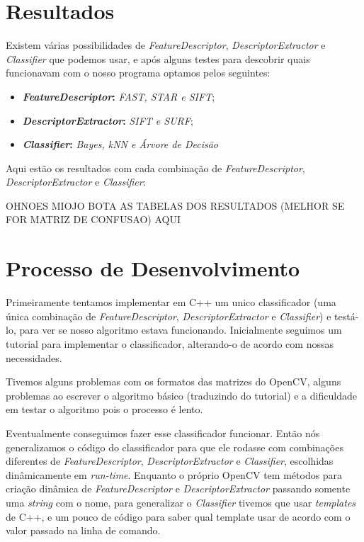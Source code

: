 \section{Resultados}
Existem várias possibilidades de \textit{FeatureDescriptor}, \textit{DescriptorExtractor} e
\textit{Classifier} que podemos usar, e após alguns testes para descobrir quais funcionavam com
o nosso programa optamos pelos seguintes:
\begin{itemize}
  \item \textbf{\textit{FeatureDescriptor}:} \textit{FAST, STAR e SIFT};
  \item \textbf{\textit{DescriptorExtractor}:} \textit{SIFT e SURF};
  \item \textbf{\textit{Classifier}:} \textit{Bayes, kNN e Árvore de Decisão}
\end{itemize}

Aqui estão os resultados com cada combinação de \textit{FeatureDescriptor}, \textit{DescriptorExtractor}
e \textit{Classifier}:

OHNOES
MIOJO
BOTA AS TABELAS DOS RESULTADOS (MELHOR SE FOR MATRIZ DE CONFUSAO) AQUI


\section{Processo de Desenvolvimento}
Primeiramente tentamos implementar em C++ um unico classificador (uma única combinação de
\textit{FeatureDescriptor}, \textit{DescriptorExtractor} e \textit{Classifier})
e testá-lo, para ver se nosso algoritmo estava funcionando. Inicialmente seguimos um tutorial
para implementar o classificador, alterando-o de acordo com nossas necessidades.

Tivemos alguns problemas com os formatos das matrizes do OpenCV, alguns problemas ao escrever
o algoritmo básico (traduzindo do tutorial) e a dificuldade em testar o algoritmo pois o
processo é lento.

Eventualmente conseguimos fazer esse classificador funcionar. Então nós generalizamos o código do
classificador para que ele rodasse com combinações diferentes de \textit{FeatureDescriptor}, 
\textit{DescriptorExtractor} e \textit{Classifier}, escolhidas dinâmicamente em \textit{run-time}.
Enquanto o próprio OpenCV tem métodos para criação dinâmica de \textit{FeatureDescriptor} e 
\textit{DescriptorExtractor} passando somente uma \textit{string} com o nome, para generalizar o
\textit{Classifier} tivemos que usar \textit{templates} de C++, e um pouco de código para saber
qual template usar de acordo com o valor passado na linha de comando.

